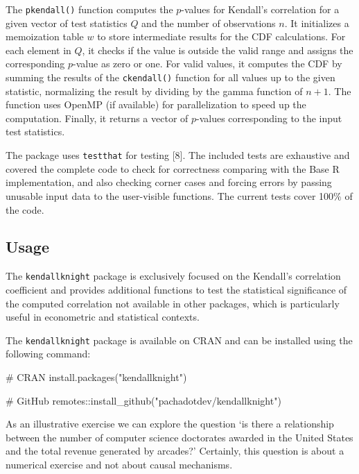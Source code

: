 \documentclass[
  10pt,
  letterpaper,
]{article}
\newenvironment{Shaded}{\begin{snugshade}}{\end{snugshade}}
\newcommand{\CommentTok}[1]{\textcolor[rgb]{0.37,0.37,0.37}{#1}}
\newcommand{\FunctionTok}[1]{\textcolor[rgb]{0.28,0.35,0.67}{#1}}
\newcommand{\NormalTok}[1]{\textcolor[rgb]{0.00,0.23,0.31}{#1}}
\newcommand{\SpecialCharTok}[1]{\textcolor[rgb]{0.37,0.37,0.37}{#1}}
\newcommand{\StringTok}[1]{\textcolor[rgb]{0.13,0.47,0.30}{#1}}
\begin{document}
The \texttt{pkendall()} function computes the \(p\)-values for Kendall's
correlation for a given vector of test statistics \(Q\) and the number
of observations \(n\). It initializes a memoization table \(w\) to store
intermediate results for the CDF calculations. For each element in
\(Q\), it checks if the value is outside the valid range and assigns the
corresponding \(p\)-value as zero or one. For valid values, it computes
the CDF by summing the results of the \texttt{ckendall()} function for
all values up to the given statistic, normalizing the result by dividing
by the gamma function of \(n + 1\). The function uses OpenMP (if
available) for parallelization to speed up the computation. Finally, it
returns a vector of \(p\)-values corresponding to the input test
statistics.

The package uses \texttt{testthat} for testing {[}8{]}. The included
tests are exhaustive and covered the complete code to check for
correctness comparing with the Base R implementation, and also checking
corner cases and forcing errors by passing unusable input data to the
user-visible functions. The current tests cover 100\% of the code.

\subsection{Usage}\label{usage}

The \texttt{kendallknight} package is exclusively focused on the
Kendall's correlation coefficient and provides additional functions to
test the statistical significance of the computed correlation not
available in other packages, which is particularly useful in econometric
and statistical contexts.

The \texttt{kendallknight} package is available on CRAN and can be
installed using the following command:

\begin{Shaded}
\begin{Highlighting}[]
\CommentTok{\# CRAN}
\FunctionTok{install.packages}\NormalTok{(}\StringTok{"kendallknight"}\NormalTok{)}

\CommentTok{\# GitHub}
\NormalTok{remotes}\SpecialCharTok{::}\FunctionTok{install\_github}\NormalTok{(}\StringTok{"pachadotdev/kendallknight"}\NormalTok{)}
\end{Highlighting}
\end{Shaded}

As an illustrative exercise we can explore the question `is there a
relationship between the number of computer science doctorates awarded
in the United States and the total revenue generated by arcades?'
Certainly, this question is about a numerical exercise and not about
causal mechanisms.
\end{document}
